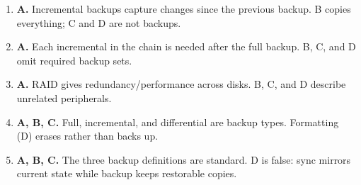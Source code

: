 \documentclass[11pt]{article}
\begin{document}
\begin{enumerate}[label=\textbf{Q\arabic*.}, leftmargin=*]
\item \textbf{A.} Incremental backups capture changes since the previous backup. B copies everything; C and D are not backups.
\item \textbf{A.} Each incremental in the chain is needed after the full backup. B, C, and D omit required backup sets.
\item \textbf{A.} RAID gives redundancy/performance across disks. B, C, and D describe unrelated peripherals.
\item \textbf{A, B, C.} Full, incremental, and differential are backup types. Formatting (D) erases rather than backs up.
\item \textbf{A, B, C.} The three backup definitions are standard. D is false: sync mirrors current state while backup keeps restorable copies.
\end{enumerate}
\def\JKSSBLessonID{11}\def\JKSSBAnswers{1}
\end{document}
